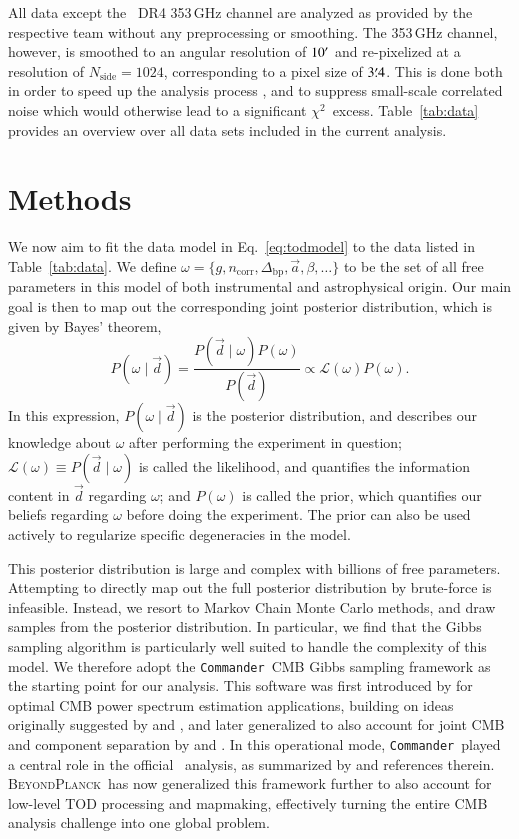 \documentclass[twocolumn]{aa}
\def\chisq{$\chi^2$}
\def\commander{\texttt{Commander}}
\renewcommand{\d}[0]{\vec{d}}
\renewcommand{\a}[0]{\vec{a}}
\newcommand{\Dbp}[0]{\Delta_{\mathrm{bp}}}
\newcommand{\BP}{\textsc{BeyondPlanck}}
\newcommand{\?}[1]{\textcolor{red}{{\bf [#1]}}}
\begin{document}
All data except the \Planck\ DR4 353\,GHz channel are analyzed as provided
by the respective team without any preprocessing or smoothing. The
353\,GHz channel, however, is smoothed to an angular resolution of
$10\arcm$ and re-pixelized at a resolution of
$N_{\mathrm{side}}=1024$, corresponding to a pixel size of
$3\overset{\prime}{.}4$. This is done both in order to speed up the analysis
process \citep{bp01,bp03}, and to suppress small-scale correlated
noise which would otherwise lead to a significant
\chisq\ excess. Table~\ref{tab:data} provides an overview over all
data sets included in the current analysis.

\section{Methods}
\label{sec:methods}

We now aim to fit the data model in Eq.~\eqref{eq:todmodel} to
the data listed in Table~\ref{tab:data}. We define
$\omega=\{g,n_{\mathrm{corr}},\Dbp,\a,\beta,\ldots\}$ to be the set of
all free parameters in this model of both instrumental and
astrophysical origin. Our main goal is then to map out the
corresponding joint posterior distribution, which is given by Bayes'
theorem,
\begin{equation}
    P(\omega\mid \d) = \frac{P(\d\mid \omega)P(\omega)}{P(\d)} \propto
  \mathcal{L}(\omega)P(\omega).
  \label{eq:jointpost}
\end{equation}
In this expression, $P(\omega\mid \d)$ is the posterior distribution, and
describes our knowledge about $\omega$ after performing the experiment in
question; $\mathcal{L}(\omega)\equiv P(\d\mid \omega)$ is called the likelihood,
and quantifies the information content in $\d$ regarding $\omega$; and
$P(\omega)$ is called the prior, which quantifies our beliefs regarding $\omega$
before doing the experiment. The prior can also be used actively to regularize
specific degeneracies in the model.

This posterior distribution is large and complex with billions of free
parameters. Attempting to directly map out the full posterior
distribution by brute-force is infeasible. Instead, we resort to
Markov Chain Monte Carlo methods, and draw samples from the posterior
distribution. In particular, we find that the Gibbs sampling algorithm
\citep{geman:1984} is particularly well suited to handle the
complexity of this model. We therefore adopt the \commander\ CMB Gibbs
sampling framework as the starting point for our analysis. This
software was first introduced by \citet{eriksen:2004} for optimal CMB
power spectrum estimation applications, building on ideas originally suggested by
\citet{jewell2004} and \citet{wandelt2004}, and later generalized to
also account for joint CMB and component separation by
\citet{eriksen2008} and \citet{seljebotn:2019}. In this operational
mode, \commander\ played a central role in the official
\Planck\ analysis, as summarized by
\citet{planck2013-p01,planck2014-a01,planck2016-l01} and references
therein. \BP\ has now generalized this framework further to also
account for low-level TOD processing and mapmaking, effectively
turning the entire CMB analysis challenge into one global problem.
\end{document}
